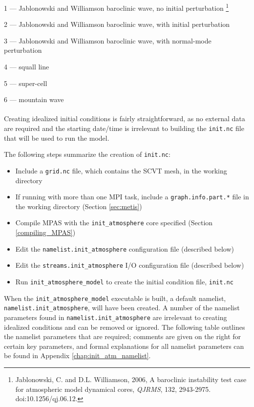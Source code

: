1 --- Jablonowski and Williamson baroclinic wave, no initial perturbation
\footnote{Jablonowski, C. and D.L. Williamson, 2006, A baroclinic instability test case for atmospheric model dynamical cores, {\em QJRMS}, 132, 2943-2975. doi:10.1256/qj.06.12.}

2 --- Jablonowski and Williamson baroclinic wave, with initial perturbation

3 --- Jablonowski and Williamson baroclinic wave, with normal-mode perturbation

4 --- squall line

5 --- super-cell

6 --- mountain wave\\
\\
Creating idealized initial conditions is fairly straightforward, as no external data are required and the starting date/time is irrelevant to building the {\tt init.nc} file that will be used to run the model.

The following steps summarize the creation of {\tt init.nc}:

\begin{itemize}
\item Include a {\tt grid.nc} file, which contains the SCVT mesh, in the working directory
\item If running with more than one MPI task, include a {\tt graph.info.part.*} file in the working directory (Section \ref{sec:metis})
\item Compile MPAS with the {\tt init\_atmosphere} core specified (Section \ref{compiling_MPAS})
\item Edit the {\tt namelist.init\_atmosphere} configuration file (described below)
\item Edit the {\tt streams.init\_atmosphere} I/O configuration file (described below)
\item Run {\tt init\_atmosphere\_model} to create the initial condition file, {\tt init.nc}
\end{itemize}

When the {\tt init\_atmosphere\_model} executable is built, a default namelist, {\tt namelist.init\_atmosphere}, will have been created. A number of the namelist parameters found in {\tt namelist.init\_atmosphere} are irrelevant to creating idealized conditions and can be removed or ignored.  The following table outlines the namelist parameters that are required; comments are given on the right for certain key parameters, and formal explanations for all namelist parameters can be found in Appendix \ref{chap:init_atm_namelist}.


